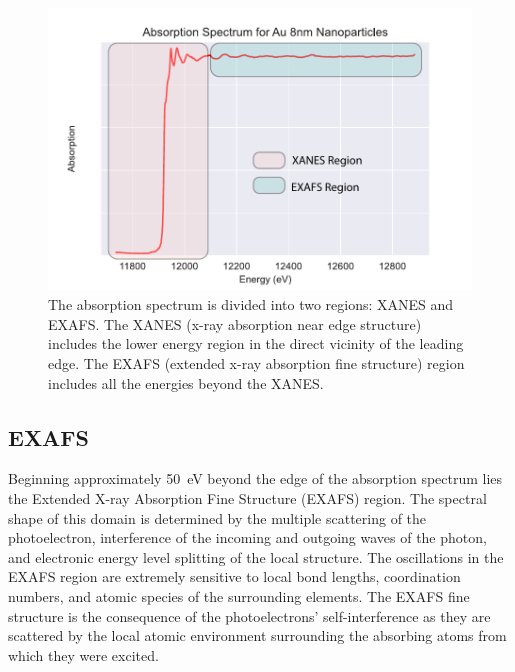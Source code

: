 \begin{figure}
    \centering
    \includegraphics[width=.75\linewidth]{Chapters/Figures/absorption-spectra-example.pdf}
    \caption[XANES vs. EXAFS Regions]{The absorption spectrum is divided into two regions: XANES and EXAFS. The XANES (x-ray absorption near edge structure) includes the lower energy region in the direct vicinity of the leading edge. The EXAFS (extended x-ray absorption fine structure) region includes all the energies beyond the XANES.}
    \label{XAFS-example-spectrum}
\end{figure}

\subsection{EXAFS}
Beginning approximately 50~eV beyond the edge of the absorption spectrum lies the Extended X-ray Absorption Fine Structure (EXAFS) region. The spectral shape of this domain is determined by the multiple scattering of the photoelectron, interference of the incoming and outgoing waves of the photon, and electronic energy level splitting of the local structure. The oscillations in the EXAFS region are extremely sensitive to local bond lengths, coordination numbers, and atomic species of the surrounding elements. The EXAFS fine structure is the consequence of the photoelectrons' self-interference as they are scattered by the local atomic environment surrounding the absorbing atoms from which they were excited.

